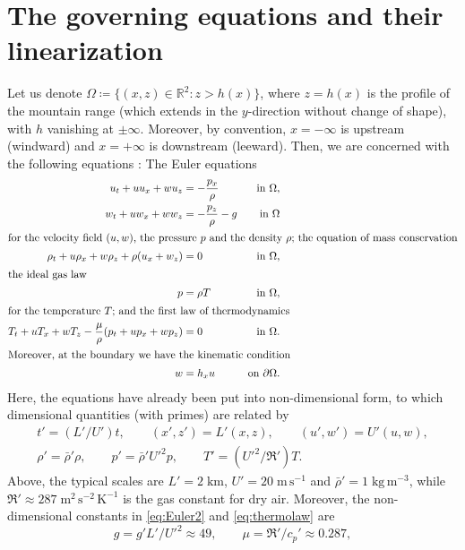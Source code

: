 \documentclass[11pt,twoside,reqno,centertags]{amsart}
\theoremstyle{definition}
\newcommand{\R}{\mathbb R}
\begin{document}
\section{The governing equations and their linearization}\label{sec:equations}
Let us denote $\Omega\coloneqq\{(x,z)\in\R^2:z>h(x)\}$, where $z=h(x)$ is the profile of the mountain range (which extends in the $y$-direction without change of shape), with $h$ vanishing at $\pm\infty$. Moreover, by convention, $x=-\infty$ is upstream (windward) and $x=+\infty$ is downstream (leeward). Then, we are concerned with the following equations \cite{Constantin23,Smith79}: The Euler equations
\begin{subequations}\label{eq:system_nonlinear}
	\begin{align}
		u_t + uu_x + wu_z &= -\frac{p_x}{\rho}&\text{in }\Omega,\\
		w_t + uw_x + ww_z &= -\frac{p_z}{\rho} - g&\text{in }\Omega\label{eq:Euler2}\\
		\intertext{for the velocity field $(u,w)$, the pressure $p$ and the density $\rho$; the equation of mass conservation}
		\rho_t + u\rho_x + w\rho_z + \rho(u_x+w_z) &= 0&\text{in }\Omega,\\
		\intertext{the ideal gas law}
		p &= \rho T&\text{in }\Omega\label{eq:gas_law},\\
		\intertext{for the temperature $T$; and the first law of thermodynamics}
		T_t + uT_x + wT_z - \frac{\mu}{\rho}(p_t + up_x + wp_z) &= 0&\text{in }\Omega.\label{eq:thermolaw}\\
		\intertext{Moreover, at the boundary we have the kinematic condition}
		w &= h_xu&\text{on }\partial\Omega.
	\end{align}
\end{subequations}
Here, the equations have already been put into non-dimensional form, to which dimensional quantities (with primes) are related by
\begin{gather*}
	t' = (L'/U') t,\qquad (x',z') = L' (x,z),\qquad (u',w') = U' (u,w),\\
	\rho' = \bar\rho' \rho, \qquad p' = \bar\rho' U'^2 p,\qquad T' = (U'^2/\mathfrak R') T.
\end{gather*}
Above, the typical scales are $L'=2\;\mathrm{km}$, $U'=20\;\mathrm{m\,s^{-1}}$ and $\bar\rho'=1\;\mathrm{kg\,m^{-3}}$, while $\mathfrak R'\approx 287\;\mathrm{m^2\,s^{-2}\,K^{-1}}$ is the gas constant for dry air. Moreover, the non-dimensional constants in \eqref{eq:Euler2} and \eqref{eq:thermolaw} are
\[g = g'L'/U'^2 \approx 49, \qquad \mu = \mathfrak R' / c_p' \approx 0.287,\]
\end{document}
